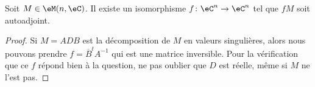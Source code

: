 \begin{corollary}
    Soit \( M\in \eM(n,\eC)\). Il existe un isomorphisme \( f\colon \eC^n\to \eC^n\) tel que \( fM\) soit autoadjoint.
\end{corollary}

\begin{proof}
    Si \( M=ADB\) est la décomposition de \( M\) en valeurs singulières, alors nous pouvons prendre \( f=\overline{ B }^tA^{-1}\) qui est une matrice inversible. Pour la vérification que ce \( f\) répond bien à la question, ne pas oublier que \( D\) est réelle, même si \( M\) ne l'est pas.
\end{proof}
